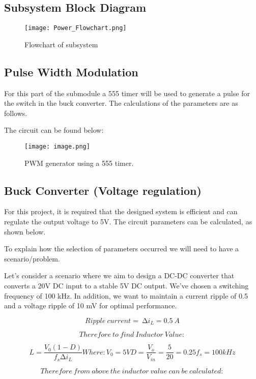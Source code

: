 \documentclass[class=report,11pt,crop=false]{standalone}
\begin{document}
\subsection{Subsystem Block Diagram}

 \begin{figure}
     \centering
     \texttt{[image: Power\_Flowchart.png]}
     \caption{Flowchart of subsystem}
     \label{fig:enter-label}
 \end{figure}

\subsection{Pulse Width Modulation}

For this part of the submodule a 555 timer will be used to generate a pulse for the switch in the buck converter. The calculations of the parameters are as follows.

The circuit can be found below:
\begin{figure}
    \centering
    \texttt{[image: image.png]}
    \caption{PWM generator using a 555 timer.}
    \label{fig:enter-label}
\end{figure}


\subsection{Buck Converter (Voltage regulation)}

For this project, it is required that the designed system is efficient and can regulate the output voltage to 5V. The circuit parameters can be calculated, as shown below.

To explain how the selection of parameters occurred we will need to have a scenario/problem. 

Let's consider a scenario where we aim to design a DC-DC converter that converts a 20V DC input to a stable 5V DC output. We've chosen a switching frequency of 100 kHz. In addition, we want to maintain a current ripple of 0.5 and a voltage ripple of 10 mV for optimal performance.

\[Ripple\ current = \ \mathrm{\Delta}i_{L} = 0.5\ A\]

\[
{Therefore\ to\ find\ Inductor\ Value:}\]

\[
{L = \frac{V_{0}(1 - D)}{f_{s}\mathrm{\Delta}i_{L}}
}{Where:
}{V_{0} = 5V
}{D = \frac{V_{o}}{V_{in}} = \frac{5}{20} = 0.25
}{f_{s} = 100kHz}\]

\[Therefore\ from\ above\ the\ inductor\ value\ can\ be\ calculated:\]
\end{document}
